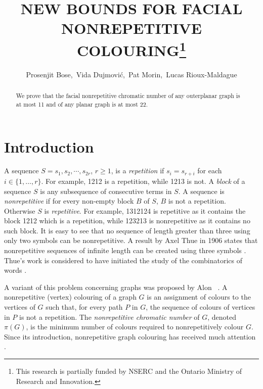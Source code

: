 \documentclass{patmorin}
\title{\MakeUppercase{New Bounds for Facial Nonrepetitive Colouring}\thanks{This research is partially funded by NSERC and the Ontario Ministry of Research and Innovation.}}
\author{Prosenjit Bose,\, Vida Dujmovi\'c,\, Pat Morin,\, Lucas Rioux-Maldague}
\begin{document}
\maketitle


\begin{abstract}
  We prove that the facial nonrepetitive chromatic number of any outerplanar graph is at most 11 and of any planar graph is at most 22.
\end{abstract}


\section{Introduction}

A sequence $S=s_1,s_2,\cdots,s_{2r}$, $r\ge 1$, is a \emph{repetition}
if $s_i=s_{r+i}$ for each $i\in\{1,\ldots,r\}$. For example, 1212
is a repetition, while 1213 is not. A \emph{block} of a sequence
$S$ is any subsequence of consecutive terms in $S$. A sequence is
\emph{nonrepetitive} if for every non-empty block $B$ of $S$, $B$
is not a repetition. Otherwise $S$ is \emph{repetitive}. For example,
1312124 is repetitive as it contains the block 1212 which is a repetition,
while 123213 is nonrepetitive as it contains no such block.  It is easy
to see that no sequence of length greater than three using only two
symbols can be nonrepetitive. A result by Axel Thue in 1906 states that
nonrepetitive sequences of infinite length can be created using three
symbols \cite{thue1906uber}. Thue's work is considered to have initiated
the study of the combinatorics of words \cite{allouche1999ubiquitous}.

A variant of this problem concerning graphs was proposed by Alon \etal\
\cite{alon2002nonrepetitive}.
A nonrepetitive (vertex) colouring of a graph $G$ is an assignment
of colours to the vertices of $G$ such that, for every path $P$ in
$G$, the sequence of colours of vertices in $P$ is not a repetition.
The \emph{nonrepetitive chromatic number} of $G$, denoted $\pi(G)$,
is the minimum number of colours required to nonrepetitively colour $G$.
Since its introduction, nonrepetitive graph colouring has received much
attention \cite{barat2013facial, barat2007square, barat2008note,
brevsar2007nonrepetitive, currie2002cycle18, dujmovic2012planarlogn,
dujmovic2011nonrepetitive, fiorenzi2011thue, gagol2016pathwidth,
gonccalves2014entropy, grytczuk2007nonrepetitivesurvey,
grytczuk2007nonrepetitive, grytczuk2013new, harant2012nonrepetitive,
kozik2013nonrepetitive, kundgen2008nonrepetitive, pezarski2009non, przybylo2013facial,
schreyer2012facial, schreyer2013total}.
\end{document}
